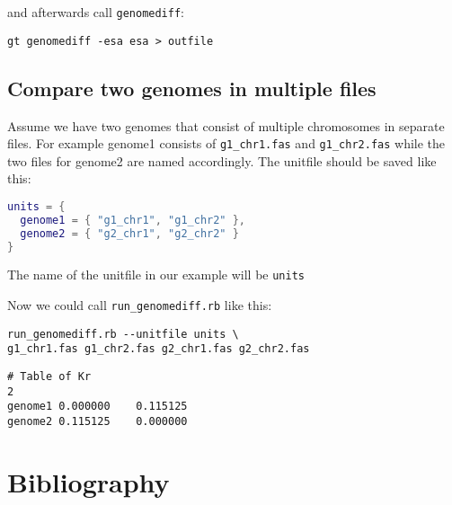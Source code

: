 \documentclass[12pt,titlepage]{article}
\newcommand{\Gdiff}{\texttt{genomediff}\xspace}
\newcommand{\RGdiff}{\texttt{run\_genomediff.rb}\xspace}
\newcommand{\File}[1]{\texttt{\small #1}}
\begin{document}
and afterwards call \Gdiff:

\begin{lstlisting}
gt genomediff -esa esa > outfile
\end{lstlisting}

\subsection{Compare two genomes in multiple files}

Assume we have two genomes that consist of multiple chromosomes in separate
files. For example genome1 consists of \File{g1\_chr1.fas} and
\File{g1\_chr2.fas} while the two files for genome2 are named accordingly.
The unitfile should be saved like this:
\begin{lstlisting}[language=lua]
units = {
  genome1 = { "g1_chr1", "g1_chr2" },
  genome2 = { "g2_chr1", "g2_chr2" }
}
\end{lstlisting}
The name of the unitfile in our example will be \File{units}

Now we could call \RGdiff like this:

\begin{lstlisting}
run_genomediff.rb --unitfile units \
g1_chr1.fas g1_chr2.fas g2_chr1.fas g2_chr2.fas
\end{lstlisting}

\begin{verbatim}
# Table of Kr
2
genome1	0.000000	0.115125
genome2	0.115125	0.000000
\end{verbatim}

\section*{Bibliography}


\end{document}
